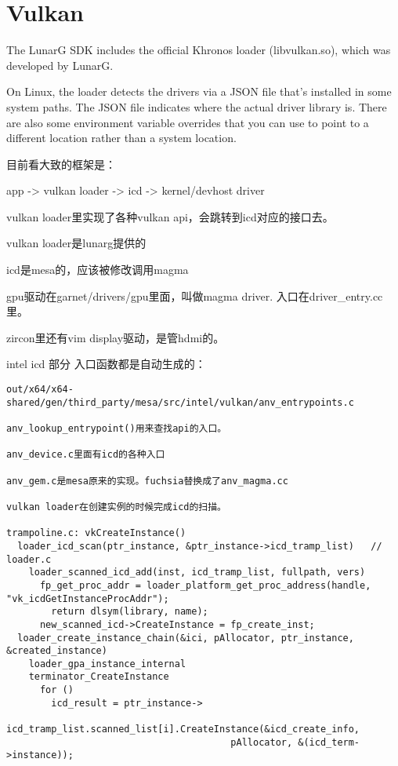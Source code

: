 \section{Vulkan}

The LunarG SDK includes the official Khronos loader (libvulkan.so), which was
developed by LunarG.

On Linux, the loader detects the drivers via a JSON file that’s installed in
some system paths. The JSON file indicates where the actual driver library is.
There are also some environment variable overrides that you can use to point to
a different location rather than a system location.

目前看大致的框架是：

app -> vulkan loader -> icd -> kernel/devhost driver

vulkan loader里实现了各种vulkan api，会跳转到icd对应的接口去。

vulkan loader是lunarg提供的

icd是mesa的，应该被修改调用magma

gpu驱动在garnet/drivers/gpu里面，叫做magma driver. 入口在driver_entry.cc里。

zircon里还有vim display驱动，是管hdmi的。

intel icd 部分
入口函数都是自动生成的：
\begin{verbatim}
out/x64/x64-shared/gen/third_party/mesa/src/intel/vulkan/anv_entrypoints.c

anv_lookup_entrypoint()用来查找api的入口。

anv_device.c里面有icd的各种入口

anv_gem.c是mesa原来的实现。fuchsia替换成了anv_magma.cc

vulkan loader在创建实例的时候完成icd的扫描。

trampoline.c: vkCreateInstance()
  loader_icd_scan(ptr_instance, &ptr_instance->icd_tramp_list)   // loader.c
    loader_scanned_icd_add(inst, icd_tramp_list, fullpath, vers)
      fp_get_proc_addr = loader_platform_get_proc_address(handle, "vk_icdGetInstanceProcAddr");
        return dlsym(library, name);
      new_scanned_icd->CreateInstance = fp_create_inst;
  loader_create_instance_chain(&ici, pAllocator, ptr_instance, &created_instance)
    loader_gpa_instance_internal
    terminator_CreateInstance
      for ()
        icd_result = ptr_instance->
            icd_tramp_list.scanned_list[i].CreateInstance(&icd_create_info, 
                                        pAllocator, &(icd_term->instance));

\end{verbatim}